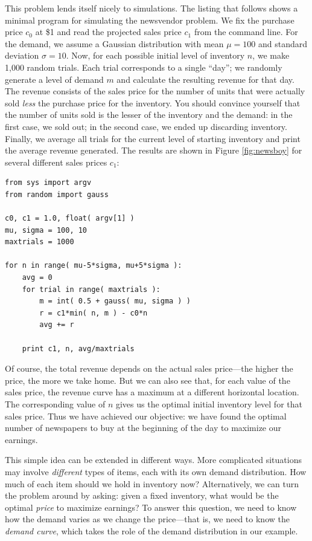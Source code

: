 This problem lends itself nicely to simulations. The listing that
follows shows a minimal program for simulating the newsvendor problem.
We fix the purchase price $c_0$ at \$1 and read the projected sales
price $c_1$ from the command line. For the demand, we assume a
Gaussian distribution with mean $\mu = 100$ and standard deviation
$\sigma = 10$. Now, for each possible initial level of inventory $n$,
we make 1,000 random trials.  Each trial corresponds to a single
``day''; we randomly generate a level of demand $m$ and calculate the
resulting revenue for that day.  The revenue consists of the sales
price for the number of units that were actually sold \emph{less} the
purchase price for the inventory. You should convince yourself that
the number of units sold is the lesser of the inventory and the
demand: in the first case, we sold out; in the second case, we ended
up discarding inventory.  Finally, we average all trials for the
current level of starting inventory and print the average revenue
generated. The results are shown in Figure \ref{fig:newsboy} for
several different sales prices $c_1$:\vspace*{3pt}

\begin{verbatim}
from sys import argv
from random import gauss

c0, c1 = 1.0, float( argv[1] )
mu, sigma = 100, 10
maxtrials = 1000

for n in range( mu-5*sigma, mu+5*sigma ):
    avg = 0
    for trial in range( maxtrials ):
        m = int( 0.5 + gauss( mu, sigma ) )       
        r = c1*min( n, m ) - c0*n
        avg += r
        
    print c1, n, avg/maxtrials
\end{verbatim}

Of course, the total revenue depends on the actual sales price---the
higher the price, the more we take home. But we can also see that, for
each value of the sales price, the revenue curve has a maximum at a
different horizontal location. The corresponding value of $n$ gives us
the optimal initial inventory level for that sales price.  Thus we
have achieved our objective: we have found the optimal number of
newspapers to buy at the beginning of the day to maximize our
earnings.

This simple idea can be extended in different ways.  More complicated
situations may involve \emph{different} types of items, each with its
own demand distribution. How much of each item should we hold in
inventory now?  Alternatively, we can turn the problem around by
asking: given a fixed inventory, what would be the optimal
\emph{price} to maximize earnings? To answer this question, we need to
know how the demand varies as we change the price---that is, we need
to know the \emph{demand curve}, which takes the role of the demand
distribution in our example.

